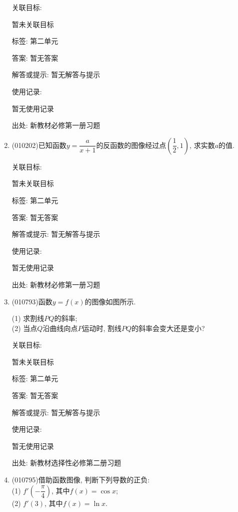 \documentclass[10pt,a4paper]{article}
\begin{document}
\begin{enumerate}[1.]
关联目标:

暂未关联目标



标签: 第二单元

答案: 暂无答案

解答或提示: 暂无解答与提示

使用记录:

暂无使用记录


出处: 新教材必修第一册习题
\item { (010202)}已知函数$y=\dfrac a{x+1}$的反函数的图像经过点$(\dfrac 12, 1)$, 求实数$a$的值.


关联目标:

暂未关联目标



标签: 第二单元

答案: 暂无答案

解答或提示: 暂无解答与提示

使用记录:

暂无使用记录


出处: 新教材必修第一册习题
\item { (010793)}函数$y=f(x)$的图像如图所示.
\begin{center}
\end{center}
(1) 求割线$PQ$的斜率;\\
(2) 当点$Q$沿曲线向点$P$运动时, 割线$PQ$的斜率会变大还是变小?


关联目标:

暂未关联目标



标签: 第二单元

答案: 暂无答案

解答或提示: 暂无解答与提示

使用记录:

暂无使用记录


出处: 新教材选择性必修第二册习题
\item { (010795)}借助函数图像, 判断下列导数的正负:\\
(1) $f'(-\dfrac \pi 4)$, 其中$f(x)=\cos x$;\\
(2) $f'(3)$, 其中$f(x)=\ln x$.



\end{enumerate}
\end{document}
